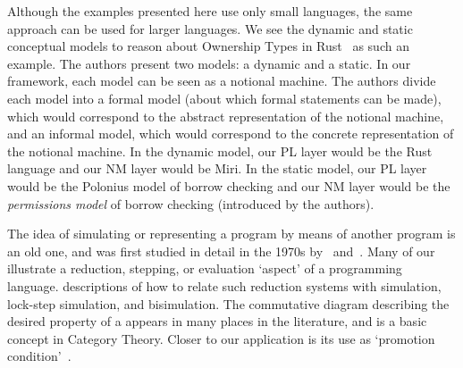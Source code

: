 Although the examples presented here use only small languages,
the same approach can be used for larger languages.
We see
the dynamic and static conceptual models
to reason about Ownership Types in Rust~\citep{crichtonGroundedConceptualModel2023}
as such an example.
The authors present two models: a dynamic and a static.
In our framework,
each model can be seen as a notional machine.
The authors divide each model into a formal model (about which formal statements can be made), which would correspond to the abstract representation of the notional machine,
and an informal model, which would correspond to the concrete representation of the notional machine.
%
In the dynamic model,
our PL layer would be the Rust language
and
our NM layer would be Miri.
%
In the static model,
our PL layer would be the Polonius model of borrow checking
and
our NM layer would be the \emph{permissions model} of borrow checking
(introduced by the authors).

The idea of simulating or representing a program by means of another program is an old one, 
and was first studied in detail in the 1970s by~\citet{milnerAlgebraicDefinitionSimulation1971} and~\citet{hoareProofCorrectnessData1972}. 
Many of our \nms{} illustrate a reduction, stepping, or evaluation `aspect' of a programming language. 
\citet{wadlerProgrammingLanguageFoundations2020} descriptions of how to relate such reduction systems with simulation, lock-step simulation, and bisimulation.
The commutative diagram describing the desired property of a \nm{} appears in many places in the literature, and is a basic concept in Category Theory. Closer to our application is its use as `promotion condition'~\cite{birdPromotionAccumulationStrategies1984,wangRefactoringPatternMatching2013}.

